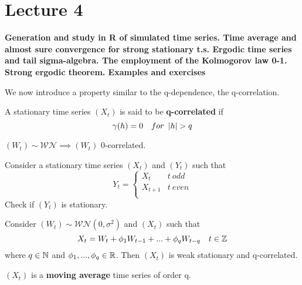 \section{Lecture 4}
\label{lecture4}

\begin{center}
    \textbf{Generation and study in R of simulated time series. Time average and almost sure convergence for strong stationary t.s. Ergodic time series and tail sigma-algebra. The employment of the Kolmogorov law 0-1. Strong ergodic theorem. Examples and exercises}
\end{center}

We now introduce a property similar to the q-dependence, the q-correlation.

\begin{definition}
    A stationary time series $(X_t)$ is said to be \textbf{q-correlated} if
    \[
        \gamma(h)=0\ \ \ for\ \abs{h}>q 
    \]
\end{definition}

\begin{example}
    $(W_t)\sim\mathcal{WN}\implies(W_t)$ 0-correlated.
\end{example}

\begin{exercise}
    Consider a stationary time series $(X_t)$ and $(Y_t)$ such that
    \begin{equation*}
        Y_t=\begin{cases}
            X_t & t\ odd\\
            X_{t+1} & t\ even\\
        \end{cases}
    \end{equation*}
    Check if $(Y_t)$ is stationary.
\end{exercise}

\begin{proposition}
    Consider $(W_t)\sim\mathcal{WN}(0,\sigma^2)$ and $(X_t)$ such that
    \[
        X_t=W_t+\phi_1W_{t-1}+...+\phi_qW_{t-q}\ \ \ t\in\Z  
    \]
    where $q\in\mathbb{N}$ and $\phi_1,...,\phi_q\in\mathbb{R}$. Then $(X_t)$ is weak stationary and q-correlated.
\end{proposition}

\begin{remark}
    $(X_t)$ is a \textbf{moving average} time series of order q.
\end{remark}

